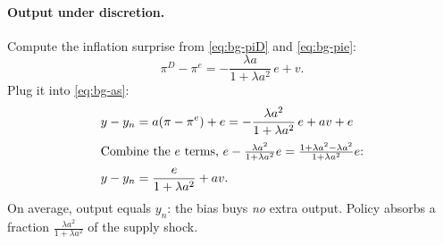 \paragraph{Output under discretion.} Compute the inflation surprise from \eqref{eq:bg-piD} and \eqref{eq:bg-pie}:
\[
\pi^D-\pi^e=-\frac{\lambda a}{1+\lambda a^2}\,e+v .
\]
Plug it into \eqref{eq:bg-as}:
\begin{align*}
y-y_n&=a(\pi-\pi^e)+e=-\frac{\lambda a^2}{1+\lambda a^2}\,e+av+e\\
\intertext{Combine the $e$ terms, $e-\frac{\lambda a^2}{1+\lambda a^2}e=\frac{1+\lambda a^2-\lambda a^2}{1+\lambda a^2}e$:}
y-y_n&=\frac{e}{1+\lambda a^2}+av .
\end{align*}
On average, output equals $y_n$: the bias buys \emph{no} extra output. Policy absorbs a fraction $\frac{\lambda a^2}{1+\lambda a^2}$ of the supply shock.


